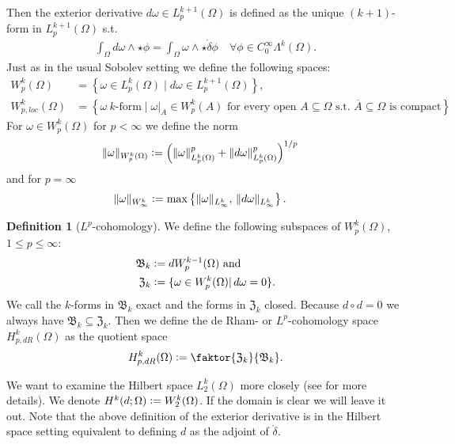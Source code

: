 \documentclass[12pt,a4paper]{article}
\numberwithin{equation}{subsection}
\numberwithin{lemma}{subsection}
\theoremstyle{definition}
\newtheorem{definition}[lemma]{Definition}
\newcommand{\lpcoho}{H^k_{p,dR}}
\newcommand{\norm}[2]{\lVert #1 \rVert_{#2}}
\begin{document}
Then the exterior derivative $ d\omega \in L^{k+1}_p(\Omega)$ is defined as
the unique $(k+1)$-form in $L^{k+1}_p(\Omega)$ s.t. 
\begin{align*}
\int_\Omega d\omega \wedge \star\phi = \int_\Omega \omega \wedge 
\star\mathring{\delta}\phi
\quad \forall \phi \in C_0^\infty \Lambda^{k}(\Omega).
\end{align*}
Just as in the usual Sobolev setting we define the following spaces:
\begin{align*}
W^k_p(\Omega) &= \left\{ \omega \in L^k_p(\Omega) \mid 
     d\omega \in L_p^{k+1}(\Omega) \right\}, \\ 
W^k_{p,loc}(\Omega) &= \left\{ \omega \ k \text{-form} \mid 
\omega|_A \in W^k_p(A) \text{ for every open } A \subseteq \Omega 
\text{ s.t. } \overline{A} \subseteq \Omega \text{ is compact} %
\right\}.
\end{align*}
For $\omega \in W^k_p(\Omega)$ for $p<\infty$ we define the norm 
\begin{align*}
\lVert \omega \rVert _{W^k_p(\Omega)} &\vcentcolon= 
\left( \norm{\omega}{L^k_p(\Omega)}^p 
    + \norm{d\omega}{L^k_p(\Omega)}^p \right)^{1/p}
\end{align*}
and for $p=\infty$
\begin{align*}
    \lVert \omega \rVert _{W^k_\infty} &\vcentcolon= 
    \max\left\{ \norm{\omega}{L^k_\infty},\, \norm{d\omega}{L^k_\infty}
    \right\}.
\end{align*}
    
\begin{definition}[$L^p$-cohomology]
    We define the following subspaces of $W^k_p(\Omega)$, $1\leq p \leq\infty$:
    \begin{align*}
        \mathfrak{B}_k &\vcentcolon= dW^{k-1}_p(\Omega) \text{ and} \\
        \mathfrak{Z}_k &\vcentcolon= \{ \omega \in W^k_p(\Omega)| 
        \, d\omega = 0\}.
    \end{align*}
    We call the $k$-forms in $\mathfrak{B}_k$ exact and the forms in 
    $\mathfrak{Z}_k$ closed. Because $d \circ d=0$ we always have  
    $\mathfrak{B}_k \subseteq \mathfrak{Z}_k$.
    Then we define the de Rham- or $L^p$-cohomology space $\lpcoho(\Omega)$ as 
    the quotient space
    \begin{align*}
        \lpcoho (\Omega) \vcentcolon= \faktor{\mathfrak{Z}_k}{\mathfrak{B}_k}.
    \end{align*}
\end{definition}
\vspace{0.5cm}
We want to examine the Hilbert space $L^k_2(\Omega)$ more closely
(see \cite[Sec. 6.2.6]{arnold} for more details).  
We denote $H^k(d;\Omega) \vcentcolon= W^k_2(\Omega)$. If the domain is clear
we will leave it out. Note that the above definition of the exterior derivative
is in the Hilbert space setting equivalent to defining $d$ as the adjoint
of $\mathring{\delta}$. 
\end{document}
